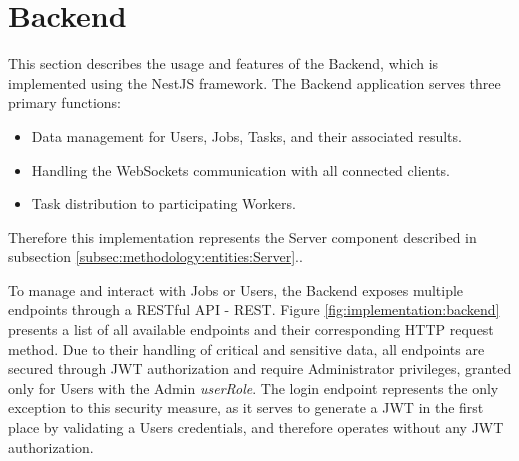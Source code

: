\section{Backend}
\label{sec:implementation:backend}
This section describes the usage and features of the Backend, which is implemented using the NestJS framework. The Backend application serves three primary functions: 

\begin{itemize}
    \item Data management for Users, Jobs, Tasks, and their associated results.
    \item Handling the WebSockets communication with all connected clients.
    \item Task distribution to participating Workers.
\end{itemize}

Therefore this implementation represents the Server component described in subsection \ref{subsec:methodology:entities:Server}..

To manage and interact with Jobs or Users, the Backend exposes multiple endpoints through a RESTful \ac{API} - \ac{REST}. Figure \ref{fig:implementation:backend} presents a list of all available endpoints and their corresponding HTTP request method. Due to their handling of critical and sensitive data, all endpoints are secured through \ac{JWT} authorization and require Administrator privileges, granted only for Users with the Admin \emph{userRole}. The login endpoint represents the only exception to this security measure, as it serves to generate a \ac{JWT} in the first place by validating a Users credentials, and therefore operates without any \ac{JWT} authorization.


